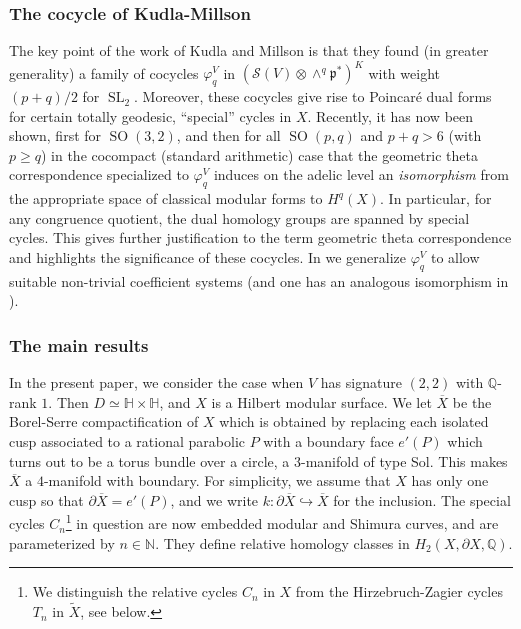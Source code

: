 \documentclass[12pt,leqno]{amsart}
\numberwithin{equation}{section}
\theoremstyle{plain}
\theoremstyle{definition}
\theoremstyle{remark}
\newcommand{\Q}{\mathbb{Q}}
\newcommand{\N}{\mathbb{N}}
\newcommand{\h}{\mathbb{H}}
\newcommand{\SL}{\operatorname{SL}}
\newcommand{\SO}{\operatorname{SO}}
\begin{document}
\subsubsection*{The cocycle of Kudla-Millson}

The key point of the work of Kudla and Millson \cite{KM1,KM2} is that they found (in greater generality) a family of cocycles $\varphi^V_{q}$ in $(\mathcal{S}(V) \otimes \wedge^q \mathfrak{p}^{\ast})^K$ with weight $(p+q)/2$ for $\SL_2$. Moreover, these cocycles give rise to Poincar\'e dual forms for certain totally geodesic, ``special'' cycles in $X$. Recently, it has now been shown, first \cite{HoffmanHe} for $\SO(3,2)$, and then \cite{BMM} for all $\SO(p,q)$ and $p+q>6$ (with $p \geq q$) in the cocompact (standard arithmetic) case that the geometric theta correspondence specialized to $\varphi_q^V$ induces on the adelic level an {\it isomorphism} from the appropriate space of classical modular forms to $H^q(X)$. In particular, for any congruence quotient, the dual homology groups are spanned by special cycles. This gives further justification to the term geometric theta correspondence and highlights the significance of these cocycles. In \cite{FMcoeff} we generalize $\varphi^V_{q}$ to allow suitable non-trivial coefficient systems (and one has an analogous isomorphism in \cite{BMM}). 


\subsubsection*{The main results}

In the present paper, we consider the case when $V$ has signature $(2,2)$ with $\Q$-rank $1$. Then $D \simeq \h \times \h$, and $X$ is a Hilbert modular surface. We let $\overline{X}$ be the Borel-Serre compactification of $X$ which is obtained by replacing each isolated cusp associated to a rational parabolic $P$ with a boundary face $e'(P)$ which turns out to be a torus bundle over a circle, a $3$-manifold of type Sol. This makes $\overline{X}$ a $4$-manifold with boundary.  For simplicity, we assume that $X$ has only one cusp so that $\partial \overline{X} = e'(P)$, and we write $k: \partial \overline{X}  \hookrightarrow \overline{X}$ for the inclusion. The special cycles $C_n$\footnote{We distinguish the relative cycles $C_n$ in $X$ from the Hirzebruch-Zagier cycles $T_n$ in $\tilde{X}$, see below.} in question are now embedded modular and Shimura curves, and are parameterized by $n \in \N$. They define relative homology classes in $H_2(X, \partial X,\Q)$. 
\end{document}
